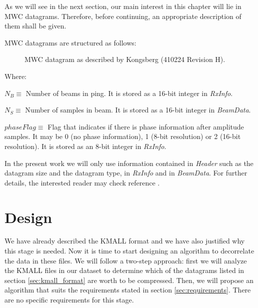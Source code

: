 As we will see in the next section, our main interest in this chapter will lie in MWC datagrams. Therefore, before continuing, an appropriate description of them shall be given.

\pagebreak
MWC datagrams are structured as follows:

\begin{figure}[h!]
	\begin{center}
		\scalebox{.565}{}
	\end{center}
	\caption{MWC datagram as described by Kongsberg (410224 Revision H).}
	\label{fig:mwc_datagram}
\end{figure}
Where:
\begin{description}
	\item $N_B \equiv$ Number of beams in ping. It is stored as a 16-bit integer in \textit{RxInfo}.
	\item $N_S \equiv$ Number of samples in beam. It is stored as a 16-bit integer in \textit{BeamData}.
	\item $phaseFlag \equiv$ Flag that indicates if there is phase information after amplitude samples. It may be 0 (no phase information), 1 (8-bit resolution) or 2 (16-bit resolution). It is stored as an 8-bit integer in \textit{RxInfo}.
\end{description}

In the present work we will only use information contained in \textit{Header} such as the datagram size and the datagram type, in \textit{RxInfo} and in \textit{BeamData}. For further details, the interested reader may check reference \parencite{KMALL}.

\section{Design}
We have already described the KMALL format and we have also justified why this stage is needed. Now it is time to start designing an algorithm to decorrelate the data in these files. We will follow a two-step approach: first we will analyze the KMALL files in our dataset to determine which of the datagrams listed in section \ref{sec:kmall_format} are worth to be compressed. Then, we will propose an algorithm that suits the requirements stated in section \ref{sec:requirements}. There are no specific requirements for this stage.


